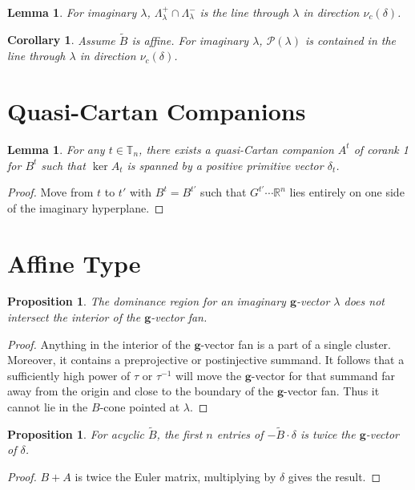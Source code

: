 \documentclass{amsart}
\newtheorem{corollary}[theorem]{Corollary}
\newtheorem{lemma}[theorem]{Lemma}
\newtheorem{proposition}[theorem]{Proposition}
\numberwithin{theorem}{section}
\newcommand{\bfg}{\boldsymbol{g}}
\newcommand{\cP}{\mathcal{P}}
\newcommand{\RR}{\mathbb{R}}
\newcommand{\TT}{\mathbb{T}}
\begin{document}
  \begin{lemma}
    For imaginary $\lambda$, $\Lambda^+_\lambda\cap\Lambda^-_\lambda$ is the line through $\lambda$ in direction $\nu_c(\delta)$.
  \end{lemma}

  \begin{corollary}
    Assume $\widetilde B$ is affine.
    For imaginary $\lambda$, $\cP(\lambda)$ is contained in the line through $\lambda$ in direction $\nu_c(\delta)$. 
  \end{corollary}


  \section{Quasi-Cartan Companions}

  \begin{lemma}
    For any $t\in\TT_n$, there exists a quasi-Cartan companion $A^t$ of corank 1 for $B^t$ such that $\ker A_t$ is spanned by a positive primitive vector $\delta_t$.
  \end{lemma}
  \begin{proof}
    Move from $t$ to $t'$ with $B^t=B^{t'}$ such that $G^{t'}\cdots\RR^n$ lies entirely on one side of the imaginary hyperplane.
  \end{proof}

  \section{Affine Type}
  
  \begin{proposition}
    The dominance region for an imaginary $\bfg$-vector $\lambda$ does not intersect the interior of the $\bfg$-vector fan.
  \end{proposition}
  \begin{proof}
    Anything in the interior of the $\bfg$-vector fan is a part of a single cluster.
    Moreover, it contains a preprojective or postinjective summand.
    It follows that a sufficiently high power of $\tau$ or $\tau^{-1}$ will move the $\bfg$-vector for that summand far away from the origin and close to the boundary of the $\bfg$-vector fan.
    Thus it cannot lie in the $B$-cone pointed at $\lambda$.
  \end{proof}

  \begin{proposition}
    For acyclic $\widetilde B$, the first $n$ entries of $-\widetilde B\cdot\delta$ is twice the $\bfg$-vector of $\delta$.
  \end{proposition}
  \begin{proof}
    $B+A$ is twice the Euler matrix, multiplying by $\delta$ gives the result.
  \end{proof}
\end{document}
